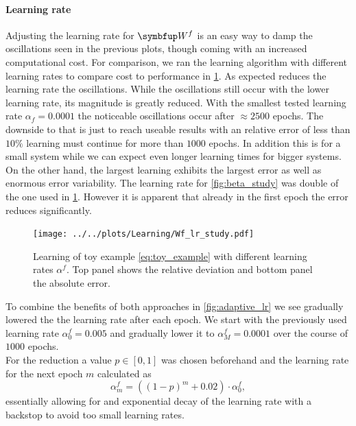 \paragraph{Learning rate}
Adjusting the learning rate for $\bmu{W}^f$ is an easy way to damp the oscillations seen in the previous plots, though coming with an increased computational cost. For comparison, we ran the learning algorithm with different learning rates to compare cost to performance in \cref{fig:lr_fast_study}. As expected reduces the learning rate the oscillations. While the oscillations still occur with the lower learning rate, its magnitude is greatly reduced. With the smallest tested learning rate $\alpha_f = 0.0001$ the noticeable oscillations occur after $\approx 2500$ epochs. The downside to that is just to reach useable results with an relative error of less than $10\%$ learning must continue for more than $1000$ epochs. In addition this is for a small system while we can expect even longer learning times for bigger systems.\\
On the other hand, the largest learning exhibits the largest error as well as enormous error variability. The learning rate for \cref{fig:beta_study} was double of the one used in \cref{fig:lr_fast_study}. However it is apparent that already in the first epoch the error reduces significantly.\\
\begin{figure}
	\centering
	\texttt{[image: ../../plots/Learning/Wf\_lr\_study.pdf]}
	\caption{Learning of toy example \cref{eq:toy_example} with different learning rates $\alpha^f$. Top panel shows the relative deviation and bottom panel the absolute error.}
	\label{fig:lr_fast_study}
\end{figure}
To combine the benefits of both approaches in \cref{fig:adaptive_lr} we see gradually lowered the the learning rate after each epoch. We start with the previously used learning rate $\alpha_0^f = 0.005$ and gradually lower it to $\alpha_M^f = 0.0001$ over the course of $1000$ epochs.\\
For the reduction a value $p\in \left[0,1\right]$ was chosen beforehand and the learning rate for the next epoch $m$ calculated as
\begin{equation}\label{eq:drop}
	\alpha_{m}^f = (\left(1-p\right)^m + 0.02)\cdot\alpha_0^f,
\end{equation}
essentially allowing for and exponential decay of the learning rate with a backstop to avoid too small learning rates.\\
